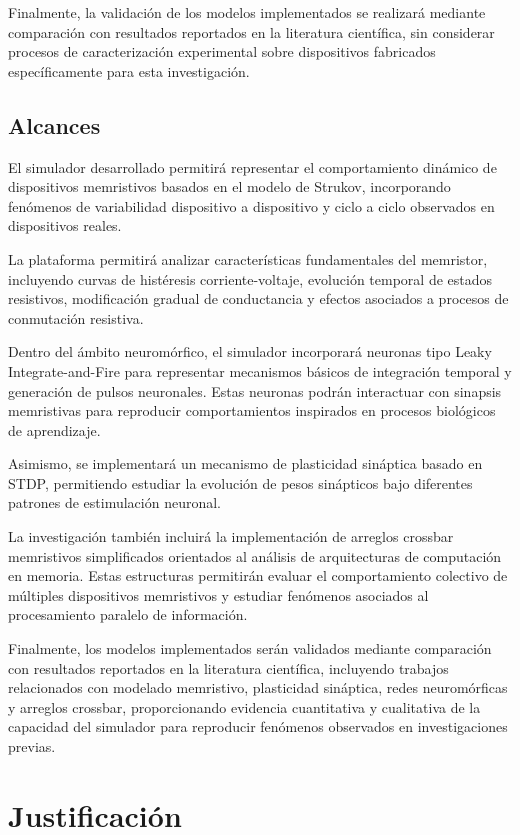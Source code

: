 Finalmente, la validación de los modelos implementados se realizará mediante comparación con resultados reportados en la literatura científica, sin considerar procesos de caracterización experimental sobre dispositivos fabricados específicamente para esta investigación.

\subsection{Alcances}

El simulador desarrollado permitirá representar el comportamiento dinámico de dispositivos memristivos basados en el modelo de Strukov, incorporando fenómenos de variabilidad dispositivo a dispositivo y ciclo a ciclo observados en dispositivos reales.

La plataforma permitirá analizar características fundamentales del memristor, incluyendo curvas de histéresis corriente-voltaje, evolución temporal de estados resistivos, modificación gradual de conductancia y efectos asociados a procesos de conmutación resistiva.

Dentro del ámbito neuromórfico, el simulador incorporará neuronas tipo Leaky Integrate-and-Fire para representar mecanismos básicos de integración temporal y generación de pulsos neuronales. Estas neuronas podrán interactuar con sinapsis memristivas para reproducir comportamientos inspirados en procesos biológicos de aprendizaje.

Asimismo, se implementará un mecanismo de plasticidad sináptica basado en STDP, permitiendo estudiar la evolución de pesos sinápticos bajo diferentes patrones de estimulación neuronal.

La investigación también incluirá la implementación de arreglos crossbar memristivos simplificados orientados al análisis de arquitecturas de computación en memoria. Estas estructuras permitirán evaluar el comportamiento colectivo de múltiples dispositivos memristivos y estudiar fenómenos asociados al procesamiento paralelo de información.

Finalmente, los modelos implementados serán validados mediante comparación con resultados reportados en la literatura científica, incluyendo trabajos relacionados con modelado memristivo, plasticidad sináptica, redes neuromórficas y arreglos crossbar, proporcionando evidencia cuantitativa y cualitativa de la capacidad del simulador para reproducir fenómenos observados en investigaciones previas.

\section{Justificación}

